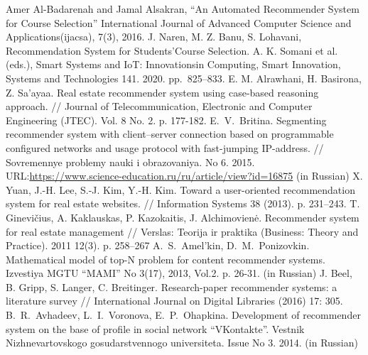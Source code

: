 \documentclass[conference]{IEEEtran}
\begin{document}
\begin{thebibliography}{99}
Amer Al-Badarenah and Jamal Alsakran, “An Automated Recommender System for Course Selection” International Journal of Advanced Computer Science and Applications(ijacsa), 7(3), 2016. 
J. Naren, M. Z. Banu, S. Lohavani, Recommendation System for Students’Course Selection. A. K. Somani et al. (eds.), Smart Systems and IoT: Innovationsin Computing, Smart Innovation, Systems and Technologies 141. 2020. pp.~825--833. 
E. M. Alrawhani, H. Basirona, Z. Sa’ayaa. Real estate recommender system using case-based reasoning approach. // Journal of
Telecommunication, Electronic and Computer Engineering (JTEC).
Vol. 8 No. 2. p. 177-182.
 E.~V.~Britina. Segmenting recommender system with client--server connection based on programmable configured networks and usage protocol with fast-jumping IP-address.  // Sovremennye problemy nauki i obrazovaniya. No 6. 2015.
URL:\url{https://www.science-education.ru/ru/article/view?id=16875} (in Russian)
 X. Yuan, J.-H. Lee, S.-J. Kim, Y.-H. Kim. Toward a user-oriented recommendation system for real estate websites. // Information Systems 38 (2013). p. 231–243.
T. Ginevičius, A. Kaklauskas, P. Kazokaitis, J. Alchimovienė.
Recommender system for real estate management // Verslas: Teorija ir
praktika (Business: Theory and Practice). 2011 12(3). p. 258–267 
A.~S.~Amel'kin, D.~M.~Ponizovkin. Mathematical model of top-N problem for content recommender systems. Izvestiya MGTU ``MAMI'' No 3(17), 2013, Vol.2. p. 26-31. (in Russian)
 J. Beel, B. Gripp, S. Langer, C. Breitinger. Research-paper recommender systems: a literature survey // International Journal on Digital Libraries (2016) 17: 305. 
 B.~R.~Avhadeev, L.~I.~Voronova, E.~P.~Ohapkina. Development of recommender system on the base of profile in social network ``VKontakte''. Vestnik Nizhnevartovskogo gosudarstvennogo universiteta. Issue No 3. 2014. (in Russian)
\end{thebibliography}
\end{document}
